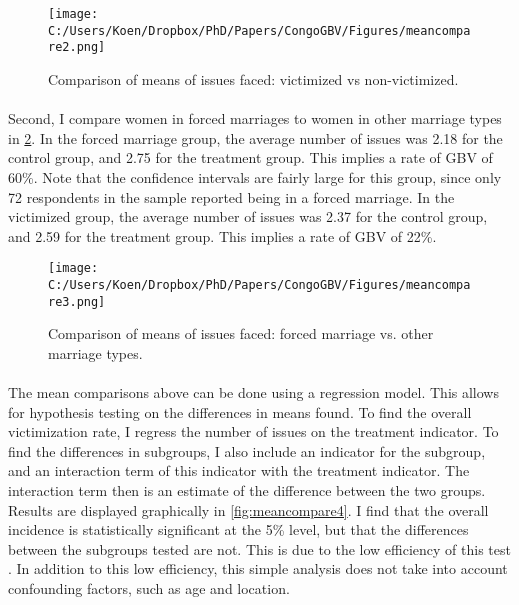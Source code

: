 \documentclass[11pt,a4paper]{scrartcl} %
\begin{document}
\begin{figure}
  \texttt{[image: C:/Users/Koen/Dropbox/PhD/Papers/CongoGBV/Figures/meancompare2.png]}
  \caption{Comparison of means of issues faced: victimized vs non-victimized.}
  \label{fig:meancompare2}
\end{figure}

\paragraph{}
Second, I compare women in forced marriages to women in other marriage types in \ref{fig:meancompare3}. In the forced marriage group, the average number of issues was 2.18 for the control group, and 2.75 for the treatment group. This implies a rate of GBV of 60\%. Note that the confidence intervals are fairly large for this group, since only 72 respondents in the sample reported being in a forced marriage. In the victimized group, the average number of issues was 2.37 for the control group, and 2.59 for the treatment group. This implies a rate of GBV of 22\%. 

\begin{figure}
  \texttt{[image: C:/Users/Koen/Dropbox/PhD/Papers/CongoGBV/Figures/meancompare3.png]}
  \caption{Comparison of means of issues faced: forced marriage vs. other marriage types.}
  \label{fig:meancompare3}
\end{figure}


\paragraph{}
The mean comparisons above can be done using a regression model. This allows for hypothesis testing on the differences in means found. To find the overall victimization rate, I regress the number of issues on the treatment indicator. To find the differences in subgroups, I also include an indicator for the subgroup, and an interaction term of this indicator with the treatment indicator. The interaction term then is an estimate of the difference between the two groups. Results are displayed graphically in \ref{fig:meancompare4}. I find that the overall incidence is statistically significant at the 5\% level, but that the differences between the subgroups tested are not. This is due to the low efficiency of this test \cite{Imai2011}. In addition to this low efficiency, this simple analysis does not take into account confounding factors, such as age and location.
\end{document}
